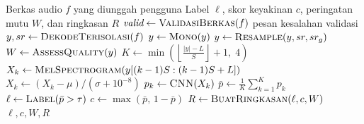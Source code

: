 \begin{algorithm}[htbp]
  \caption{Alur Analisis Rekaman ADADeH}
  \label{alg:analisis-audio}
  \begin{algorithmic}[1]
    \Require Berkas audio $f$ yang diunggah pengguna
    \Ensure Label $\ell$, skor keyakinan $c$, peringatan mutu $W$, dan ringkasan $R$
    \State $\textit{valid} \gets \textsc{ValidasiBerkas}(f)$ 
      \State \Return pesan kesalahan validasi
    \EndIf
    \State $y, sr \gets \textsc{DekodeTerisolasi}(f)$ 
    \State $y \gets \textsc{Mono}(y)$
      \State $y \gets \textsc{Resample}(y, sr, sr_g)$
    \EndIf
    \State $W \gets \textsc{AssessQuality}(y)$
    \State $K \gets \min\left(\left\lfloor \frac{|y| - L}{S} \right\rfloor + 1,\; 4\right)$ 
      \State $X_k \gets \textsc{MelSpectrogram}(y[(k-1)S : (k-1)S + L])$ 
      \State $X_k \gets (X_k - \mu) / (\sigma + 10^{-8})$
      \State $p_k \gets \textsc{CNN}(X_k)$ 
    \EndFor
    \State $\bar{p} \gets \frac{1}{K} \sum_{k=1}^{K} p_k$ 
    \State $\ell \gets \textsc{Label}(\bar{p} > \tau)$ 
    \State $c \gets \max(\bar{p},\, 1 - \bar{p})$
    \State $R \gets \textsc{BuatRingkasan}(\ell, c, W)$
    \State \Return $\ell, c, W, R$
  \end{algorithmic}
\end{algorithm}
